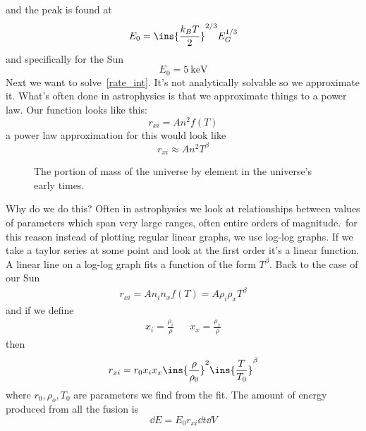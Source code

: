and the peak is found at
\begin{equation}
	E_0 = \ins{\frac{k_B T}{2}}^{2/3}E_G^{1/3}
\end{equation}
and specifically for the Sun
\begin{equation}
	E_0 = \SI{5}{\kilo\electronvolt}
\end{equation}
Next we want to solve~\ref{rate_int}. It's not analytically solvable so we approximate it. What's often done in astrophysics is that we approximate things to a power law. Our function looks like this:
\begin{equation}
	r_{xi} = An^2f(T)
\end{equation}
a power law approximation for this would look like
\begin{equation}
	r_{xi} \approx An^2T^\beta
\end{equation}
\begin{figure}
	\caption{The portion of mass of the universe by element in the universe's early times.}
\end{figure}
Why do we do this? Often in astrophysics we look at relationships between values of parameters which span very large ranges, often entire orders of magnitude.\ for this reason instead of plotting regular linear graphs, we use log-log graphs. If we take a taylor series at some point and look at the first order it's a linear function. A linear line on a log-log graph fits a function of the form \(T^\beta \). Back to the case of our Sun
\begin{align}
	r_{xi} = An_i n_x f(T) = A\rho_i\rho_x T^\beta
\end{align}
and if we define
\begin{align}
	x_i = \frac{\rho_i}{\rho} && x_x = \frac{\rho_x}{\rho}
\end{align}
then
\begin{equation}
	r_{xi} = r_0x_i x_x\ins{\frac{\rho}{\rho_0}}^2\ins{\frac{T}{T_0}}^\beta
\end{equation}
where \(r_0,\rho_o,T_0\) are parameters we find from the fit. The amount of energy produced from all the fusion is
\begin{equation}
	\dd E = E_0 r_{xi}\dd t \dd V
\end{equation}
